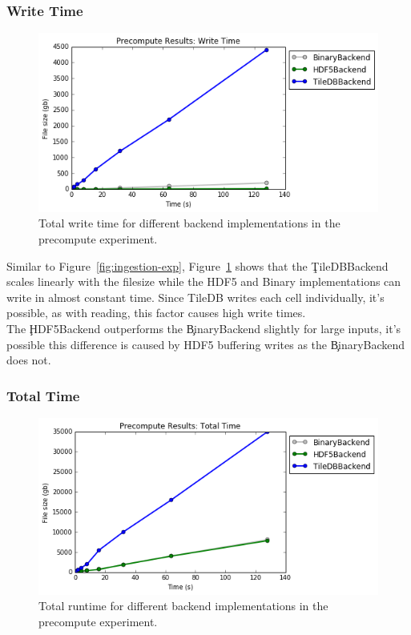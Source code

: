 \subsubsection{Write Time}

\begin{figure}[h]
\begin{center}
\includegraphics[scale=0.75]{./img/precompute-exp-write-time.png}
\caption{Total write time for different backend implementations in the
  precompute experiment.}
\label{fig:precompute-exp-write-time}
\end{center}
\end{figure}

Similar to Figure~\ref{fig:ingestion-exp},
Figure~\ref{fig:precompute-exp-write-time} shows that the \c{TileDBBackend}
scales linearly with the filesize while the HDF5 and Binary implementations can
write in almost constant time. Since TileDB writes each cell individually, it's
possible, as with reading, this factor causes high write times. \\

The \c{HDF5Backend} outperforms the \c{BinaryBackend} slightly for large
inputs, it's possible this difference is caused by HDF5 buffering writes as
the \c{BinaryBackend} does not.

\subsubsection{Total Time}

\begin{figure}[h]
\begin{center}
\includegraphics[scale=0.75]{./img/precompute-exp-total-time.png}
\caption{Total runtime for different backend implementations in the precompute
  experiment.}
\label{fig:precompute-exp-total-time}
\end{center}
\end{figure}

